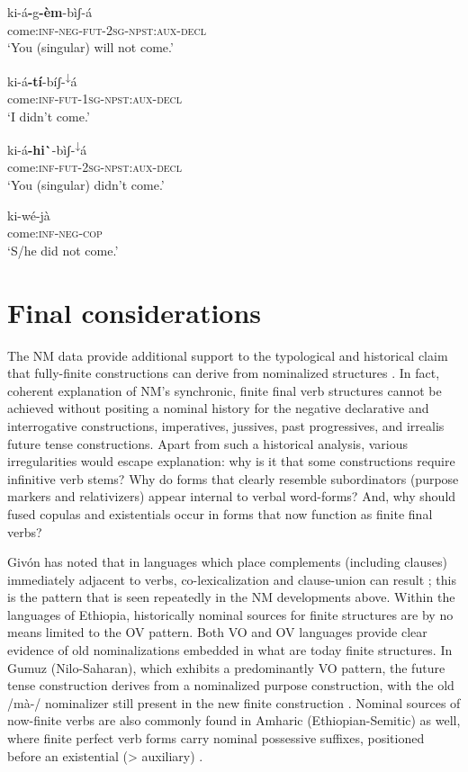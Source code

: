 \documentclass[output=paper]{langsci/langscibook}
\begin{document}
\ea\label{ex:mahland:83}
\gll ki-\'{a}\textbf{{}-}g\textbf{{}-\`{e}m}{}-b\`{i}ʃ-\'{a}     \\
come:\textsc{inf-neg-fut-2sg-npst:aux-decl} \\
\glt `You (singular) will not come.'
\z

\ea\label{ex:mahland:84}
\gll ki-\'{a}\textbf{{}-}\textbf{t\'{i}}{}-b\'{i}ʃ-\textsuperscript{↓}\'{a}  \\
come:\textsc{inf-fut-1sg-npst:aux-decl} \\
\glt `I didn't come.'
\z

\ea\label{ex:mahland:85}
\gll ki-\'{a}\textbf{{}-hi}\textbf{\`{ }}{}-b\`{i}ʃ-\textsuperscript{↓}\'{a}  \\
come:\textsc{inf-fut-2sg-npst:aux-decl}\\
\glt `You (singular) didn't come.'
\z

\ea\label{ex:mahland:86}
\gll ki-w\'{e}-j\`{a}\\
come:\textsc{inf-neg-cop}\\
\glt `S/he did not come.'
\z

\section{Final considerations}\label{sec:mahland:4}


The NM data provide additional support to the typological and historical claim that fully-finite constructions can derive from nominalized structures \citep{Gildea1993, Heine1993, Anderson2006, Anderson2011, DeLancey2011}. In fact, coherent explanation of NM's synchronic, finite final verb structures cannot be achieved without positing a nominal history for the negative declarative and interrogative constructions, imperatives, jussives, past progressives, and irrealis future tense constructions. Apart from such a historical analysis, various irregularities would escape explanation: why is it that some constructions require infinitive verb stems? Why do forms that clearly resemble subordinators (purpose markers and relativizers) appear internal to verbal word-forms? And, why should fused copulas and existentials occur in forms that now function as finite final verbs? 


Giv\'{o}n has noted that in languages which place complements (including clauses) immediately adjacent to verbs, co-lexicalization and clause-union can result \citep[74]{Givon2009}; this is the pattern that is seen repeatedly in the NM developments above. Within the languages of Ethiopia, historically nominal sources for finite structures are by no means limited to the OV pattern. Both VO and OV languages provide clear evidence of old nominalizations embedded in what are today finite structures. In Gumuz (Nilo-Saharan), which exhibits a predominantly VO pattern, the future tense construction derives from a nominalized purpose construction, with the old /m\`{a}-/ nominalizer still present in the new finite construction \citep[444]{CAhland2012}. Nominal sources of now-finite verbs are also commonly found in Amharic (Ethiopian-Semitic) as well, where finite perfect verb forms carry nominal possessive suffixes, positioned before an existential ({\textgreater} auxiliary) \citep[387]{Leslau1995}.  
\end{document}
